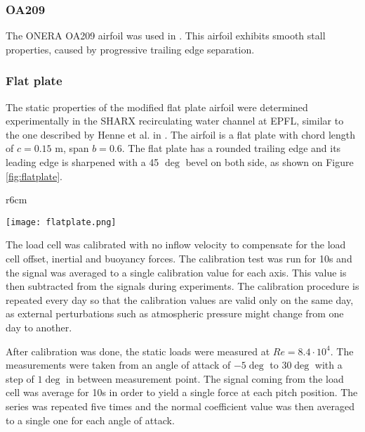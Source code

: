 \subsubsection{OA209}

The ONERA OA209 airfoil was used in \cite{mulleners_onset_2010}. This airfoil exhibits smooth stall properties, caused by progressive trailing edge separation.

\iffalse
\begin{figure}[h]
    \centering
    \texttt{[image: static\_OA209.png]}
    \caption{Normal coefficient curve for airfoil OA209, in steady-state from angles of attack from $\alpha=3 \deg$ to $24 \deg$}
    \label{fig:static_flatplate}
\end{figure}
\fi

\subsubsection{Flat plate}

The static properties of the modified flat plate airfoil were determined experimentally in the SHARX recirculating water channel at EPFL, similar to the one described by Henne et al. in \cite{henne_dynamic_2018}. The airfoil is a flat plate with chord length of $c=0.15$ m, span $b=0.6$. The flat plate has a rounded trailing edge and its leading edge is sharpened with a 45 $\deg$ bevel on both side, as shown on Figure \ref{fig:flatplate}.

\begin{wrapfigure}{r}{6cm}
	\begin{center}
	\texttt{[image: flatplate.png]}
	\end{center}
	\caption{Spanwise cut of the flat plate airfoil}
	\label{fig:flatplate}
\end{wrapfigure}

The load cell was calibrated with no inflow velocity to compensate for the load cell offset, inertial and  buoyancy forces. The calibration test was run for 10s and the signal was averaged to a single calibration value for each axis. This value is then subtracted from the signals during experiments. The calibration procedure is repeated every day so that the calibration values are valid only on the same day, as external perturbations such as atmospheric pressure might change from one day to another. 

After calibration was done, the static loads were measured at $Re=8.4\cdot10^4$. The measurements were taken from an angle of attack of $-5 \deg$ to $30 \deg$ with a step of $1 \deg$ in between measurement point. The signal coming from the load cell was average for 10s in order to yield a single force at each pitch position. The series was repeated five times and the normal coefficient value was then averaged to a single one for each angle of attack. 

